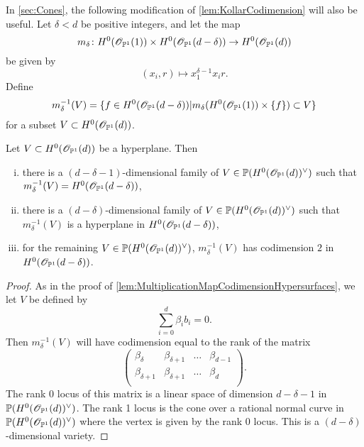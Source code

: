 In \cref{sec:Cones}, the following modification of \cref{lem:KollarCodimension} will also be useful. Let $\delta < d$ be positive integers, and let the map
\[m_\delta \colon H^0(\mathscr{O}_{\mathbb{P}^1}(1)) \times H^0(\mathscr{O}_{\mathbb{P}^1}(d-\delta)) \to H^0(\mathscr{O}_{\mathbb{P}^1}(d)) \]
be given by
\[ (x_i, r) \mapsto x_1^{\delta-1}x_ir. \]
Define
	\[m_\delta^{-1}(V) = \lbrace f \in H^0(\mathscr{O}_{\mathbb{P}^1}(d-\delta)) \vert m_{\delta}(H^0(\mathscr{O}_{\mathbb{P}^1}(1)) \times \lbrace f\rbrace) \subset V \rbrace\]
for a subset $V \subset H^0(\mathscr{O}_{\mathbb{P}^1}(d))$.
\begin{lemma}
  \label{lem:CodimensionCone}
  Let $V \subset H^0(\mathscr{O}_{\mathbb{P}^1}(d))$ be a hyperplane. Then
  \begin{enumerate}[i)]
\item there is a $(d-\delta-1)$-dimensional family of $V \in \mathbb{P}(H^0(\mathscr{O}_{\mathbb{P}^1}(d))^\vee)$ such that $m_\delta^{-1}(V) = H^0(\mathscr{O}_{\mathbb{P}^1}(d-\delta))$,
\item there is a $(d-\delta)$-dimensional family of $V \in \mathbb{P}(H^0(\mathscr{O}_{\mathbb{P}^1}(d))^\vee)$ such that $m_\delta^{-1}(V)$ is a hyperplane in $H^0(\mathscr{O}_{\mathbb{P}^1}(d-\delta))$,
\item for the remaining $V \in \mathbb{P}(H^0(\mathscr{O}_{\mathbb{P}^1}(d))^\vee)$, $m_\delta^{-1}(V)$ has codimension $2$ in ${H^0(\mathscr{O}_{\mathbb{P}^1}(d-\delta))}$.
  \end{enumerate}
\end{lemma}
\begin{proof}
  As in the proof of \cref{lem:MultiplicationMapCodimensionHypersurfaces}, we let $V$ be defined by 
		\[ \sum_{i=0}^{d} \beta_{i}b_i = 0. \] Then
$m_\delta^{-1}(V)$ will have codimension equal to the rank of the matrix
\[
  \begin{pmatrix}
    \beta_{\delta} & \beta_{\delta+1} & \dots & \beta_{d-1}\\
    \beta_{\delta+1} & \beta_{\delta+1} & \dots & \beta_{d}\\
  \end{pmatrix}.
 \]
The rank 0 locus of this matrix is a linear space of dimension $d-\delta-1$ in $\mathbb{P}(H^0(\mathscr{O}_{\mathbb{P}^1}(d))^\vee)$. The rank 1 locus is the cone over a rational normal curve in $\mathbb{P}(H^0(\mathscr{O}_{\mathbb{P}^1}(d))^\vee)$ where the vertex is given by the rank 0 locus. This is a $(d-\delta)$-dimensional variety.
\end{proof}


